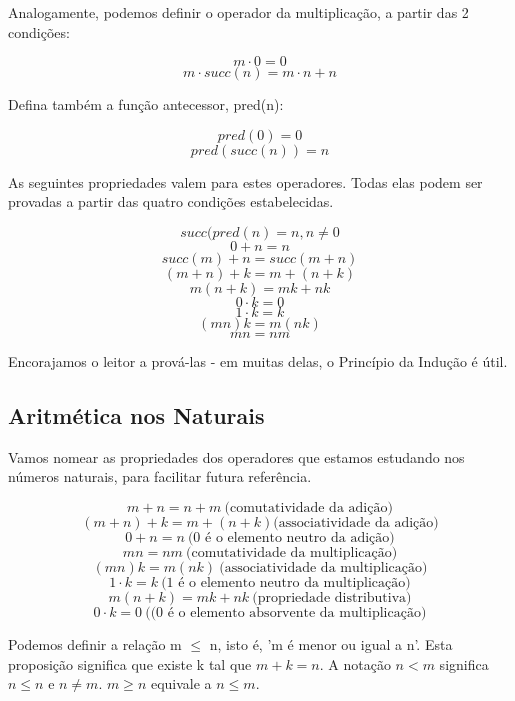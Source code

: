 Analogamente, podemos definir o operador da multiplicação, a partir das 2 condições:
\begin{center}
\[m\cdot0=0\]
\[m\cdot succ(n) = m\cdot n + n\] 
\end{center}

Defina também a função antecessor, pred(n):
\begin{center}
\[pred(0)=0\]
\[pred(succ(n)) = n\] 
\end{center}

As seguintes propriedades valem para estes operadores. Todas elas podem ser provadas a partir das quatro condições estabelecidas. 

\begin{center}
\[succ(pred(n) = n, n \neq 0\]
\[0 + n  = n\]
\[succ(m) + n = succ(m+n)\] 
\[(m+n)+k = m+(n+k)\] 
\[m(n+k)=mk+nk\] 
\[0\cdot k = 0\] 
\[1\cdot k = k\] 
\[(mn)k = m(nk)\] 
\[mn = nm\] 
\end{center}
Encorajamos o leitor a prová-las - em muitas delas, o Princípio da Indução é útil.


\subsection{Aritmética nos Naturais}

Vamos nomear as propriedades dos operadores que estamos estudando nos números naturais, para facilitar futura referência.
\begin{center}
\[m+n=n+m \ \textrm{(comutatividade da adição)}\]
\[(m+n)+k = m+(n+k) \textrm{(associatividade da adição)}\] 
\[0 + n  = n \ \textrm{(0 é o elemento neutro da adição)}\]
\[mn = nm \ \textrm{(comutatividade da multiplicação)}\] 
\[(mn)k = m(nk)\ \textrm{(associatividade da multiplicação)}\] 
\[1\cdot k = k \ \textrm{(1 é o elemento neutro da multiplicação)}\] 
\[m(n+k)=mk+nk\ \textrm{(propriedade distributiva)}\] 
\[0\cdot k = 0\ \textrm{((0 é o elemento absorvente da multiplicação)}\] 
\end{center}
Podemos definir a relação m $\leq$ n, isto é, 'm é menor ou igual a n'. Esta proposição significa que existe k tal que $m+k=n$. A notação $n < m$ significa $n \leq n$ e $n \neq m$. $m \geq n$ equivale a $n \leq m$.

